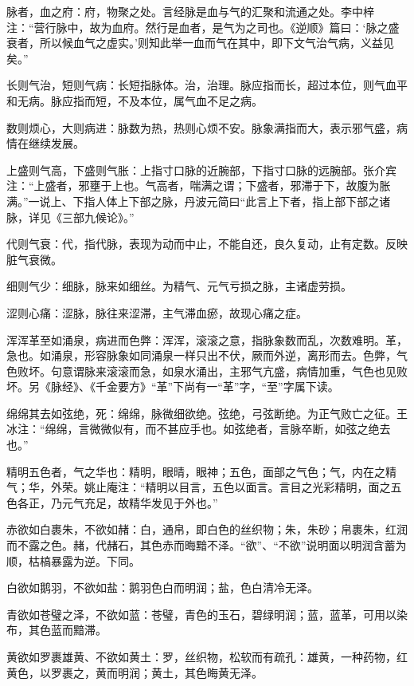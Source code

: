 \documentclass[12pt]{ctexbook}
\begin{document}
\begin{jiaozhu}
  \item 脉者，血之府：府，物聚之处。言经脉是血与气的汇聚和流通之处。李中梓注：“营行脉中，故为血府。然行是血者，是气为之司也。《逆顺》篇曰：‘脉之盛衰者，所以候血气之虚实。’则知此举一血而气在其中，即下文气治气病，义益见矣。”
  \item 长则气治，短则气病：长短指脉体。治，治理。脉应指而长，超过本位，则气血平和无病。脉应指而短，不及本位，属气血不足之病。
  \item 数则烦心，大则病进：脉数为热，热则心烦不安。脉象满指而大，表示邪气盛，病情在继续发展。
  \item 上盛则气高，下盛则气胀：上指寸口脉的近腕部，下指寸口脉的远腕部。张介宾注：“上盛者，邪壅于上也。气高者，喘满之谓；下盛者，邪滞于下，故腹为胀满。”一说上、下指人体上下部之脉，丹波元简曰“此言上下者，指上部下部之诸脉，详见《三部九候论》。”
  \item 代则气衰：代，指代脉，表现为动而中止，不能自还，良久复动，止有定数。反映脏气衰微。
  \item 细则气少：细脉，脉来如细丝。为精气、元气亏损之脉，主诸虚劳损。
  \item 涩则心痛：涩脉，脉往来涩滞，主气滞血瘀，故现心痛之症。
  \item 浑浑革至如涌泉，病进而色弊：浑浑，滚滚之意，指脉象数而乱，次数难明。革，急也。如涌泉，形容脉象如同涌泉一样只出不伏，厥而外逆，离形而去。色弊，气色败坏。句意谓脉来滚滚而急，如泉水涌出，主邪气亢盛，病情加重，气色也见败坏。另《脉经》、《千金要方》“革”下尚有一“革”字，“至”字属下读。
  \item 绵绵其去如弦绝，死：绵绵，脉微细欲绝。弦绝，弓弦断绝。为正气败亡之征。王冰注：“绵绵，言微微似有，而不甚应手也。如弦绝者，言脉卒断，如弦之绝去也。”
  \item 精明五色者，气之华也：精明，眼晴，眼神；五色，面部之气色；气，内在之精气；华，外荣。姚止庵注：“精明以目言，五色以面言。言目之光彩精明，面之五色各正，乃元气充足，故精华发见于外也。”
  \item 赤欲如白裹朱，不欲如赭：白，通帛，即白色的丝织物；朱，朱砂；帛裹朱，红润而不露之色。赭，代赭石，其色赤而晦黯不泽。“欲”、“不欲”说明面以明润含蓄为顺，枯槁暴露为逆。下同。
  \item 白欲如鹅羽，不欲如盐：鹅羽色白而明润；盐，色白清冷无泽。
  \item 青欲如苍璧之泽，不欲如蓝：苍璧，青色的玉石，碧绿明润；蓝，蓝革，可用以染布，其色蓝而黯滞。
  \item 黄欲如罗裹雄黄、不欲如黄土：罗，丝织物，松软而有疏孔：雄黄，一种药物，红黄色，以罗裹之，黄而明润；黄土，其色晦黄无泽。

\end{jiaozhu}
\end{document}
